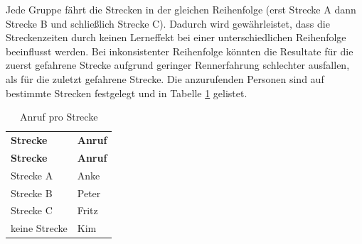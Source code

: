 \documentclass[12pt,a4paper]{scrartcl}
\begin{document}
Jede Gruppe fährt die Strecken in der gleichen Reihenfolge (erst Strecke A dann Strecke B und schließlich Strecke C). Dadurch wird gewährleistet, dass die Streckenzeiten durch keinen Lerneffekt bei einer unterschiedlichen Reihenfolge beeinflusst werden. Bei inkonsistenter Reihenfolge könnten die Resultate für die zuerst gefahrene Strecke aufgrund geringer Rennerfahrung schlechter ausfallen, als für die zuletzt gefahrene Strecke. Die anzurufenden Personen sind auf bestimmte Strecken festgelegt und in Tabelle \ref{anrufstrecke1} gelistet. \newpage

\begin{longtable}{p{6cm}p{6cm}}
	\label{anrufstrecke1}\\
	\caption[Anruf pro Strecke]{Anruf pro Strecke}\\
	\hline
	\textbf{Strecke} &	\textbf{Anruf}\\
	\hline
	\endfirsthead
	\hline
	\textbf{Strecke} &	\textbf{Anruf}\\
	\hline
	\endhead
Strecke A & Anke\\
Strecke B & Peter\\
Strecke C & Fritz\\
keine Strecke & Kim\\


\hline
\end{longtable}
\end{document}
